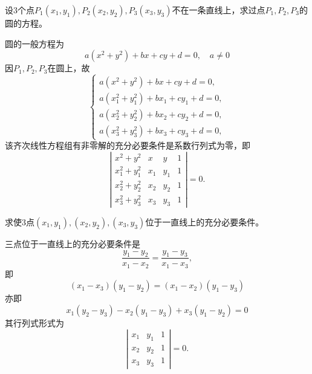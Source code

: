 \begin{frame}
  \begin{footnotesize}
    \begin{exampleblock}{46}
      设3个点$P_1(x_1,y_1),P_2(x_2,y_2),P_3(x_3,y_3)$不在一条直线上，求过点$P_1,P_2,P_3$的圆的方程。
    \end{exampleblock}
    \pause
    \jiename
    圆的一般方程为
    $$
    a(x^2+y^2)+bx+cy+d=0, \quad a\ne 0
    $$
    因$P_1,P_2,P_3$在圆上，故
    $$
    \left\{
    \begin{array}{l}
      a(x^2+y^2)+bx+cy+d=0,\\[0.1cm]
      a(x_1^2+y_1^2)+bx_1+cy_1+d=0,\\[0.1cm]
      a(x_2^2+y_2^2)+bx_2+cy_2+d=0,\\[0.1cm]
      a(x_3^2+y_3^2)+bx_3+cy_3+d=0,      
    \end{array}
    \right.
    $$
    该齐次线性方程组有非零解的充分必要条件是系数行列式为零，即
    $$
    \left|
    \begin{array}{cccc}
      x^2+y^2 & x & y & 1\\
      x_1^2+y_1^2 & x_1 & y_1 & 1\\
      x_2^2+y_2^2 & x_2 & y_2 & 1\\
      x_3^2+y_3^2 & x_3 & y_3 & 1
    \end{array}
    \right| = 0.
    $$
  \end{footnotesize}
\end{frame}

\begin{frame}
  \begin{footnotesize}
    \begin{exampleblock}{47}
      求使3点$(x_1,y_1), (x_2,y_2), (x_3,y_3)$位于一直线上的充分必要条件。
    \end{exampleblock}
    \pause
    \jiename
    三点位于一直线上的充分必要条件是
    $$
    \frac{y_1-y_2}{x_1-x_2}=\frac{y_1-y_3}{x_1-x_3},
    $$
    即
    $$
    (x_1-x_3)(y_1-y_2)=(x_1-x_2)(y_1-y_3)
    $$
    亦即
    $$
    x_1(y_2-y_3)-x_2(y_1-y_3)+x_3(y_1-y_2)=0
    $$
    其行列式形式为
    $$
    \left|
    \begin{array}{ccc}
      x_1&y_1&1\\
      x_2&y_2&1\\
      x_3&y_3&1
    \end{array}
    \right|=0.
    $$
  \end{footnotesize}
\end{frame}

